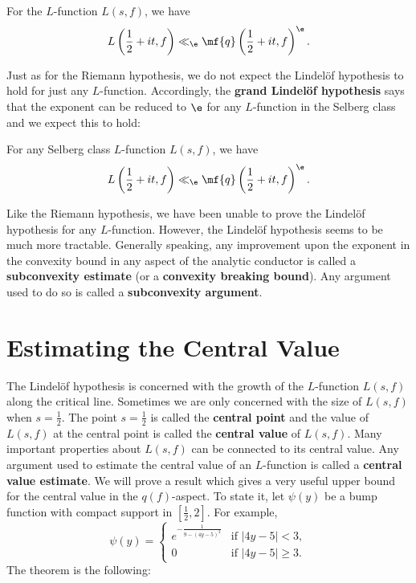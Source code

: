     \begin{conjecture}
      For the $L$-function $L(s,f)$, we have
      \[
        L\left(\frac{1}{2}+it,f\right) \ll_{\e} \mf{q}\left(\frac{1}{2}+it,f\right)^{\e}.
      \]
    \end{conjecture}

    Just as for the Riemann hypothesis, we do not expect the Lindel\"of hypothesis to hold for just any $L$-function. Accordingly, the \textbf{grand Lindel\"of hypothesis} says that the exponent can be reduced to $\e$ for any $L$-function in the Selberg class and we expect this to hold:

    \begin{conjecture}
      For any Selberg class $L$-function $L(s,f)$, we have
      \[
        L\left(\frac{1}{2}+it,f\right) \ll_{\e} \mf{q}\left(\frac{1}{2}+it,f\right)^{\e}.
      \]
    \end{conjecture}

    Like the Riemann hypothesis, we have been unable to prove the Lindel\"of hypothesis for any $L$-function. However, the Lindel\"of hypothesis seems to be much more tractable. Generally speaking, any improvement upon the exponent in the convexity bound in any aspect of the analytic conductor is called a \textbf{subconvexity estimate} (or a \textbf{convexity breaking bound}). Any argument used to do so is called a \textbf{subconvexity argument}.
  \section{Estimating the Central Value}
    The Lindel\"of hypothesis is concerned with the growth of the $L$-function $L(s,f)$ along the critical line. Sometimes we are only concerned with the size of $L(s,f)$ when $s = \frac{1}{2}$. The point $s = \frac{1}{2}$ is called the \textbf{central point} and the value of $L(s,f)$ at the central point is called the \textbf{central value} of $L(s,f)$. Many important properties about $L(s,f)$ can be connected to its central value. Any argument used to estimate the central value of an $L$-function is called a \textbf{central value estimate}. We will prove a result which gives a very useful upper bound for the central value in the $q(f)$-aspect. To state it, let $\psi(y)$ be a bump function with compact support in $\left[\frac{1}{2},2\right]$. For example,
    \[
      \psi(y) = \begin{cases} e^{-\frac{1}{9-(4y-5)^{2}}} & \text{if $|4y-5| < 3$}, \\ 0 & \text{if $|4y-5| \ge 3$}. \end{cases}
    \]
    The theorem is the following:

